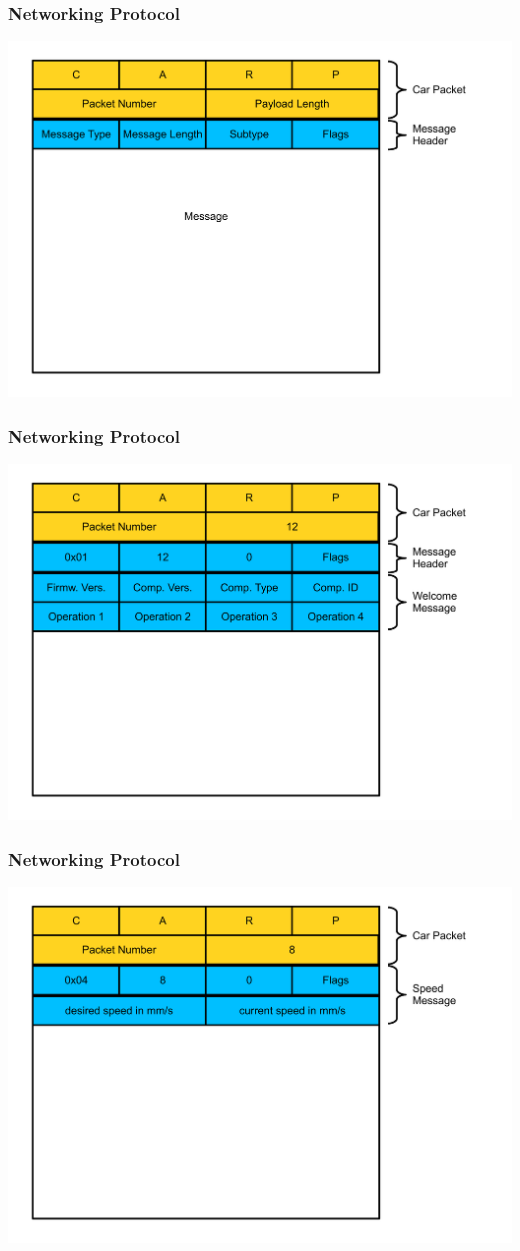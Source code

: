 \documentclass{beamer}
\begin{document}
\begin{frame}
	\frametitle{Networking Protocol}
	\includegraphics[scale=0.35]{figures/prot1.pdf}
\end{frame}

\begin{frame}
	\frametitle{Networking Protocol}
	\includegraphics[scale=0.35]{figures/prot2.pdf}
\end{frame}

\begin{frame}
	\frametitle{Networking Protocol}
	\includegraphics[scale=0.35]{figures/prot3.pdf}
\end{frame}
\end{document}
